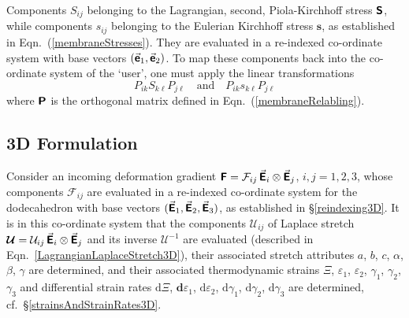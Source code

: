 Components $S_{ij}$ belonging to the Lagrangian, second, Piola-Kirchhoff stress $\boldsymbol{\mathsf{S}}$, while components $s_{ij}$ belonging to the Eulerian Kirchhoff stress $\boldsymbol{s}$, as established in Eqn.~(\ref{membraneStresses}).  They are evaluated in a re-indexed co-ordinate system with base vectors $( \vec{\boldsymbol{\mathsf{e}}}_1 , \vec{\boldsymbol{\mathsf{e}}}_2 )$.  To map these components back into the co-ordinate system of the `user', one must apply the linear transformations
\begin{displaymath}
    P_{ik} S_{k\ell} P_{j\ell}
    \quad \text{and} \quad
    P_{ik} s_{k\ell} P_{j\ell} 
\end{displaymath}
where $\boldsymbol{\mathsf{P}}$ is the orthogonal matrix defined in Eqn.~(\ref{membraneRelabling}).

\subsection{3D Formulation}

Consider an incoming deformation gradient $\boldsymbol{\mathsf{F}} = \mathcal{F}_{ij} \, \vec{\boldsymbol{\mathsf{E}}}_i \otimes \vec{\boldsymbol{\mathsf{E}}}_j$, $i, j = 1, 2, 3$, whose components $\mathcal{F}_{ij}$ are evaluated in a re-indexed co-ordinate system for the dodecahedron with base vectors $( \vec{\boldsymbol{\mathsf{E}}}_1 , \vec{\boldsymbol{\mathsf{E}}}_2 , \vec{\boldsymbol{\mathsf{E}}}_3 )$, as established in \S\ref{reindexing3D}.  It is in this co-ordinate system that the components $\mathcal{U}_{ij}$ of Laplace stretch $\boldsymbol{\mathcal{U}} = \mathcal{U}_{ij} \, \vec{\boldsymbol{\mathsf{E}}}_i \otimes \vec{\boldsymbol{\mathsf{E}}}_j$ and its inverse $\boldsymbol{\mathcal{U}}^{-1}$ are evaluated (described in Eqn.~\ref{LagrangianLaplaceStretch3D}), their associated stretch attributes $a$, $b$, $c$, $\alpha$, $\beta$, $\gamma$ are determined, and their associated thermo\-dynamic strains $\Xi$, $\varepsilon_1$, $\varepsilon_2$, $\gamma_1$, $\gamma_2$, $\gamma_3$ and differential strain rates $\mathrm{d} \Xi$, $\mathbf{d} \varepsilon_1$, $\mathrm{d} \varepsilon_2$, $\mathrm{d} \gamma_1$, $\mathrm{d} \gamma_2$, $\mathrm{d} \gamma_3$ are determined, cf.\ \S\ref{strainsAndStrainRates3D}.

